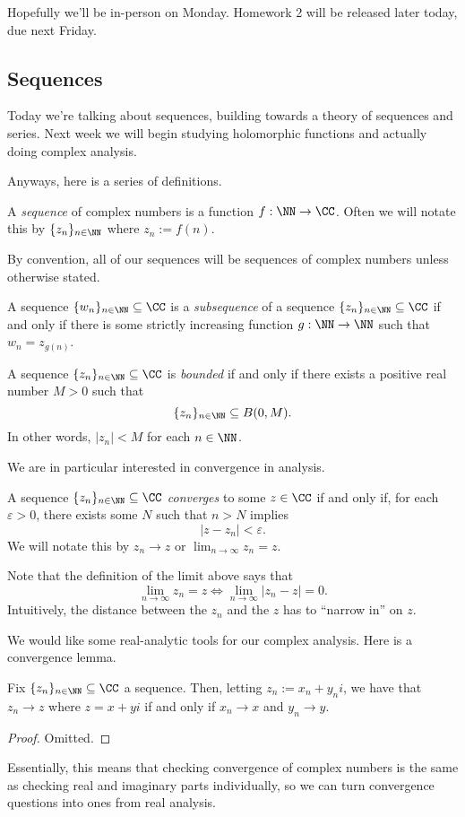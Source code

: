
Hopefully we'll be in-person on Monday. Homework 2 will be released later today, due next Friday.

\subsection{Sequences}
Today we're talking about sequences, building towards a theory of sequences and series. Next week we will begin studying holomorphic functions and actually doing complex analysis.

Anyways, here is a series of definitions.
\begin{definition}[Sequence]
	A \textit{sequence} of complex numbers is a function $f:\NN\to\CC$. Often we will notate this by $\{z_n\}_{n\in\NN}$ where $z_n:=f(n)$.
\end{definition}
By convention, all of our sequences will be sequences of complex numbers unless otherwise stated.
\begin{definition}[Convergence]
	A sequence $\{w_n\}_{n\in\NN}\subseteq\CC$ is a \textit{subsequence} of a sequence $\{z_n\}_{n\in\NN}\subseteq\CC$ if and only if there is some strictly increasing function $g:\NN\to\NN$ such that $w_n=z_{g(n)}$.
\end{definition}
\begin{definition}[Bounded]
	A sequence $\{z_n\}_{n\in\NN}\subseteq\CC$ is \textit{bounded} if and only if there exists a positive real number $M>0$ such that
	\[\{z_n\}_{n\in\NN}\subseteq B(0,M).\]
	In other words, $|z_n|<M$ for each $n\in\NN$.
\end{definition}
We are in particular interested in convergence in analysis.
\begin{definition}[Converges]
	A sequence $\{z_n\}_{n\in\NN}\subseteq\CC$ \textit{converges} to some $z\in\CC$ if and only if, for each $\varepsilon>0$, there exists some $N$ such that $n>N$ implies
	\[|z-z_n|<\varepsilon.\]
	We will notate this by $z_n\to z$ or $\lim_{n\to\infty}z_n=z$.
\end{definition}
Note that the definition of the limit above says that
\[\lim_{n\to\infty}z_n=z\iff\lim_{n\to\infty}|z_n-z|=0.\]
Intuitively, the distance between the $z_n$ and the $z$ has to ``narrow in'' on $z$. 

We would like some real-analytic tools for our complex analysis. Here is a convergence lemma.
\begin{lemma}
	Fix $\{z_n\}_{n\in\NN}\subseteq\CC$ a sequence. Then, letting $z_n:=x_n+y_ni$, we have that $z_n\to z$ where $z=x+yi$ if and only if $x_n\to x$ and $y_n\to y$.
\end{lemma}
\begin{proof}
	Omitted.\todo{}
\end{proof}
Essentially, this means that checking convergence of complex numbers is the same as checking real and imaginary parts individually, so we can turn convergence questions into ones from real analysis.

